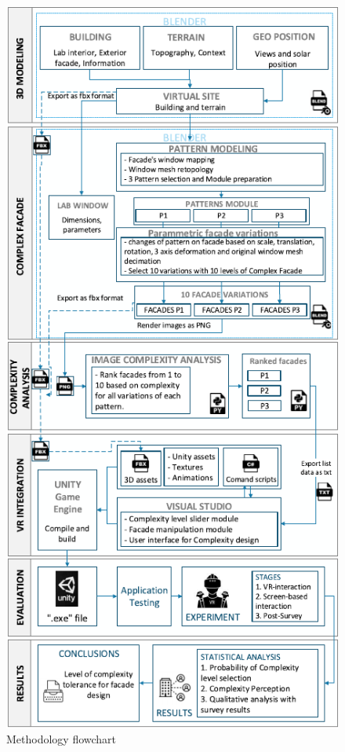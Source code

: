     \begin{figure}[!htb]
      \centering
      \includegraphics[width= \linewidth, trim=0 0 0 0, clip]{Images/MethodologyFlowchart}
      \caption{Methodology flowchart}
      \label{fig:MethodologyFlowchart}
    \end{figure}